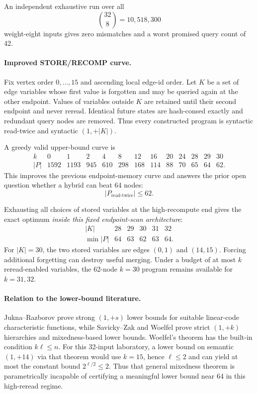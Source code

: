 An independent exhaustive run over all
\[\binom{32}{8}=10{,}518{,}300\]
weight-eight inputs gives zero mismatches and a worst promised query count of 42.

\paragraph{Improved STORE/RECOMP curve.}
Fix vertex order $0,\ldots,15$ and ascending local edge-id order. Let $K$ be a set of edge variables whose first value is forgotten and may be queried again at the other endpoint. Values of variables outside $K$ are retained until their second endpoint and never reread. Identical future states are hash-consed exactly and redundant query nodes are removed. Thus every constructed program is syntactic read-twice and syntactic $(1,+|K|)$.

A greedy valid upper-bound curve is
\[
\begin{array}{c|rrrrrrrrrrrr}
k&0&1&2&4&8&12&16&20&24&28&29&30\\
\hline
|P|&1592&1193&945&610&298&168&114&88&70&65&64&62.
\end{array}
\]
This improves the previous endpoint-memory curve and answers the prior open question whether a hybrid can beat 64 nodes:
\[\boxed{|P_{\mathrm{read\mbox{-}twice}}|\le62}.\]

Exhausting all choices of stored variables at the high-recompute end gives the exact optimum \emph{inside this fixed endpoint-scan architecture}:
\[
\begin{array}{c|ccccc}
|K|&28&29&30&31&32\\
\hline
\min |P|&64&63&62&63&64.
\end{array}
\]
For $|K|=30$, the two stored variables are edges $(0,1)$ and $(14,15)$. Forcing additional forgetting can destroy useful merging. Under a budget of at most $k$ reread-enabled variables, the 62-node $k=30$ program remains available for $k=31,32$.

\paragraph{Relation to the lower-bound literature.}
Jukna--Razborov prove strong $(1,+s)$ lower bounds for suitable linear-code characteristic functions, while Savicky--Zak and Woelfel prove strict $(1,+k)$ hierarchies and mixedness-based lower bounds. Woelfel's theorem has the built-in condition $k\ell\le n$. For this 32-input laboratory, a lower bound on semantic $(1,+14)$ via that theorem would use $k=15$, hence $\ell\le2$ and can yield at most the constant bound $2^{\ell/2}\le2$. Thus that general mixedness theorem is parametrically incapable of certifying a meaningful lower bound near 64 in this high-reread regime.

